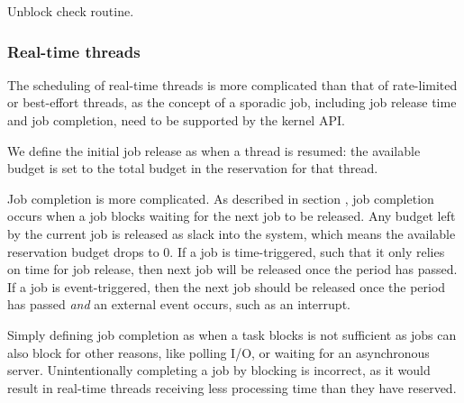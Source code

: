\begin{listing}
    \begin{ccode}
void unblock_check(sched_context_t *sc) {
  if (!head_refill(sc).time > now)) {
    return;
  }

  head_refill(sc).time = now;
  // merge available replenishments
  while (refill_size(sc) > 1) {
    if (refill_next(sc).time < now + head_refill(sc).amount) {
      refill_t old_head = pop_head(sc);
      head_refill(sc).amount += old_head.amount;
      head_refill(sc).time = now;
    } else {
      break;
    }

    if (head_refill(sc).amount < MIN_BUDGET) {
      // second part of split_check can leave refills
      // with less than MIN_BUDGET amount.
      // detect them here and merge.
      refill_t old_head = pop_head(sc);
      head_refill(sc).amount += old_head.amount;
    }
}
\end{ccode}
\caption{Unblock check routine.}
\label{list:unblock-check}
\end{listing}

\subsubsection{Real-time threads}

The scheduling of real-time threads is more complicated than that of rate-limited or best-effort
threads, as the concept of a sporadic job, including job release time and job completion, need to be
supported by the kernel API.

We define the initial job release as when a thread is resumed: the available budget is set to the
total budget in the reservation for that thread.

Job completion is more complicated.  As described in section , job
completion occurs when a job blocks waiting for the next job to be released.  Any budget left by the
current job is released as slack into the system, which means the available reservation budget drops
to 0.  If a job is time-triggered, such that it only relies on time for job release, then next job
will be released once the period has passed.  If a job is event-triggered, then the next job should
be released once the period has passed \textit{and} an external event occurs, such as an interrupt.

Simply defining job completion as when a task blocks is not sufficient as jobs can also block for
other reasons, like polling I/O, or waiting for an asynchronous server.  Unintentionally completing
a job by blocking is incorrect, as it would result in real-time threads receiving less processing
time than they have reserved.


